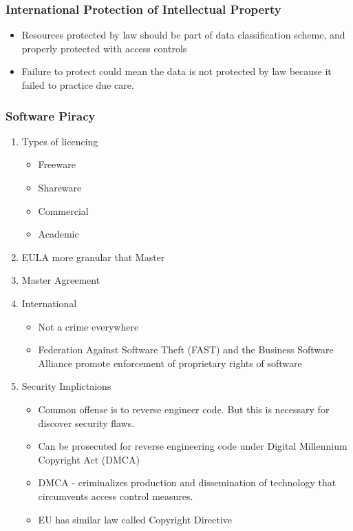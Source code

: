 \documentclass[11pt]{article}
\begin{document}
\subsubsection{International Protection of Intellectual Property}
\label{sec:org2a5de26}
\begin{itemize}
\item Resources protected by law should be part of data classification scheme, and properly protected with access controls
\item Failure to protect could mean the data is not protected by law because it failed to practice due care.
\end{itemize}
\subsubsection{Software Piracy}
\label{sec:org6508b95}
\begin{enumerate}
\item Types of licencing
\label{sec:orgfd68c1f}
\begin{itemize}
\item Freeware
\item Shareware
\item Commercial
\item Academic
\end{itemize}
\item EULA
\label{sec:org76fbd7e}
more granular that Master
\item Master Agreement
\label{sec:orgcbebfc1}
\item International
\label{sec:orgd5ea518}
\begin{itemize}
\item Not a crime everywhere
\item Federation Against Software Theft (FAST) and the Business Software Alliance promote enforcement of proprietary rights of software
\end{itemize}
\item Security Implictaions
\label{sec:orge8f5890}
\begin{itemize}
\item Common offense is to reverse engineer code. But this is necessary for discover security flaws.
\item Can be prosecuted for reverse engineering code under Digital Millennium Copyright Act (DMCA)
\item DMCA - criminalizes production and dissemination of technology that circumvents access control measures.
\item EU has similar law called Copyright Directive
\end{itemize}
\end{enumerate}
\end{document}
